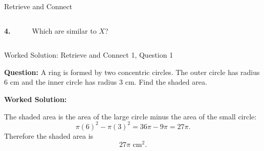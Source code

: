 \documentclass{beamer}
\newcommand{\ashow}[1]{\uncover<2->{\textcolor{red}{\small #1}}}
\newcommand{\cuboid}[4]{
\begin{scope}[shift={(#1,#2)}]
  \draw (0,0) rectangle (2,1);
  \draw (0.6,0.6) rectangle (2.6,1.6);
  \draw (0,0) -- (0.6,0.6);
  \draw (2,0) -- (2.6,0.6);
  \draw (2,1) -- (2.6,1.6);
  \draw (0,1) -- (0.6,1.6);

  \node at (1,-0.4) {\tiny \bf{#3}};
  \node at (1,-1.2) {\tiny #4};

  \StrBefore{#4}{×}[\widthstr]                %
  \StrBehind{#4}{×}[\temp]                    %
  \StrBefore{\temp}{×}[\heightstr]             %
  \StrBehind{\temp}{×}[\depthstr]               %

  \draw (0,0) -- (0,-0.6);                     %
  \draw (2,0) -- (2,-0.6);                      %
  \draw (0,-0.8) -- (2,-0.8);                   %
  \draw (0,-0.75) -- (0,-0.85);
  \draw (2,-0.75) -- (2,-0.85);
  \node at (1,-0.8) [fill=white, inner sep=1pt] {\tiny \widthstr};

  \draw (0,0) -- (-0.6,0);                      %
  \draw (0,1) -- (-0.6,1);                       %
  \draw (-0.8,0) -- (-0.8,1);                    %
  \draw (-0.75,0) -- (-0.85,0);
  \draw (-0.75,1) -- (-0.85,1);
  \node at (-0.8,0.5) [fill=white, inner sep=1pt] {\tiny \heightstr};

    \coordinate (B) at (2,0);
    \coordinate (F) at (2.6,0.6);
    \coordinate (dir) at ($(F)-(B)$);              %
    \coordinate (offset) at (0.3,-0.3);
    \def\shorten{0.1}
    \coordinate (start) at ($(B)+(offset)+\shorten*(dir)$);
    \coordinate (end)   at ($(F)+(offset)-\shorten*(dir)$);
    \draw (start) -- (end);
    \coordinate (tickDir) at ($(0,0)!0.1!(dir)$);        %
\coordinate (start) at ($(B)+(offset)+(0,0)!\shorten!(dir)$);
\coordinate (end)   at ($(F)+(offset)-(0,0)!\shorten!(dir)$);;
    \node at ($(start)!0.5!(end)$) [fill=white, inner sep=1pt] {\tiny \depthstr};
\end{scope}
}
\begin{document}
\begin{frame}{Retrieve and Connect}
\begin{columns}[T]

\ashow{\(\frac{1}{6}\times 27\pi = 4.5\pi\text{ cm}^2\)}

\vspace{0.2cm}

\textbf{4.}
\begin{center}
\end{center}


Which are similar to $X$?

\ashow{Similar shapes: B, C, D}

\end{columns}

\end{frame}


\begin{frame}{Worked Solution: Retrieve and Connect 1, Question 1}
\hypertarget{work-st1}{}

\textbf{Question:} A ring is formed by two concentric circles. The outer circle has radius \(6\) cm and the inner circle has radius \(3\) cm. Find the shaded area.

\textbf{Worked Solution:}

The shaded area is the area of the large circle minus the area of the small circle:
\[
\pi(6)^2-\pi(3)^2
=36\pi-9\pi
=27\pi.
\]
Therefore the shaded area is
\[
\boxed{27\pi\text{ cm}^2}.
\]

\end{frame}
\end{document}

